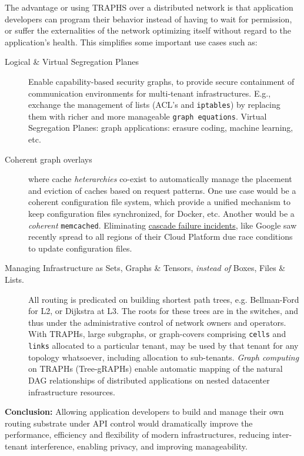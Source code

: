 \documentclass[../HFT-main.tex]{subfiles}
\begin{document}
The advantage or using TRAPHS over a distributed network is that application developers can program their behavior instead of having to wait for permission, or suffer the externalities of the network optimizing itself without regard to the application's health. This simplifies some important use cases such as:
\begin{description}
	\item [Logical \& Virtual Segregation Planes] Enable capability-based security graphs, to provide secure containment of communication environments for multi-tenant infrastructures. E.g., exchange the management of lists (ACL's and \texttt{iptables}) by replacing them with richer and more manageable \texttt{graph equations}. Virtual Segregation Planes: graph applications: erasure coding, machine learning, etc.
\vspace{-3pt}
	\item [Coherent graph overlays] where cache \emph{heterarchies} co-exist to automatically manage the placement and eviction of caches based on request patterns. One use case would be a coherent configuration file system, which provide a unified mechanism to keep configuration files synchronized, for Docker, etc. Another would be a \emph{coherent} \texttt{memcached}. Eliminating \href{https://status.cloud.google.com/incident/compute/16007?post-mortem}{cascade failure incidents}, like Google saw recently spread to all regions of their Cloud Platform due race conditions to update configuration files. 
\vspace{-3pt}
	\item [Managing Infrastructure as Sets, Graphs \& Tensors, \emph{instead of} Boxes, Files \& Lists.]  All routing is predicated on building shortest path trees, e.g. Bellman-Ford for L2, or Dijkstra at L3. The roots for these trees are in the switches, and thus under the administrative control of network owners and operators. With TRAPHs, large subgraphs, or graph-covers comprising \texttt{cells} and \texttt{links} allocated to a particular tenant, may be used by that tenant for any topology whatsoever, including allocation to sub-tenants. \emph{Graph computing} on TRAPHs (Tree-gRAPHs) enable automatic mapping of the natural DAG relationships of distributed applications on  nested %
datacenter infrastructure resources.
\vspace{-6pt}
\end{description}
\vspace{-6pt}
\begin{framed}
\noindent \textbf{Conclusion:} Allowing application developers to build and manage their own routing substrate under API control would dramatically improve the performance, efficiency and flexibility of modern   infrastructures, reducing inter-tenant interference, enabling privacy, and improving manageability.
\end{framed}
\end{document}
